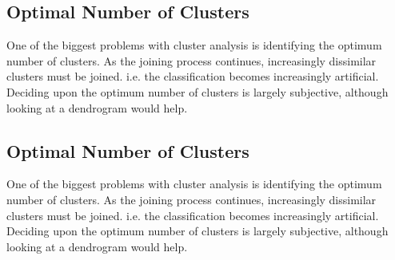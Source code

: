 \subsection{Optimal Number of Clusters}
One of the biggest problems with cluster analysis is identifying the optimum number of
clusters. As the joining process continues, increasingly dissimilar clusters must be joined. i.e. the classification becomes increasingly artificial. Deciding upon the optimum number
of clusters is largely subjective, although looking at a dendrogram would help.

\subsection{Optimal Number of Clusters}
One of the biggest problems with cluster analysis is identifying the optimum number of
clusters. As the joining process continues, increasingly dissimilar clusters must be joined. i.e. the classification becomes increasingly artificial. Deciding upon the optimum number
of clusters is largely subjective, although looking at a dendrogram would help.
